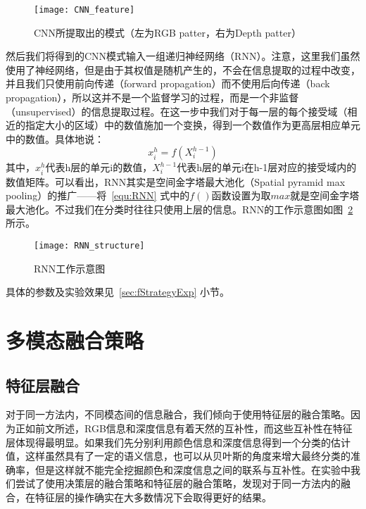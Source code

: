 \begin{figure}[H] %
  \centering
  \texttt{[image: CNN\_feature]}
  \caption{CNN所提取出的模式（左为RGB patter，右为Depth patter）}
  \label{fig:CNN_feature}
\end{figure}

然后我们将得到的CNN模式输入一组递归神经网络（RNN）。注意，这里我们虽然使用了神经网络，但是由于其权值是随机产生的，不会在信息提取的过程中改变，并且我们只使用前向传递（forward propagation）而不使用后向传递（back propagation），所以这并不是一个监督学习的过程，而是一个非监督（unsupervised）的信息提取过程。在这一步中我们对于每一层的每个接受域（相近的指定大小的区域）中的数值施加一个变换，得到一个数值作为更高层相应单元中的数值。具体地说：
\begin{equation}
\label{equ:RNN}
x_i^h = f(X_i^{h-1})
\end{equation}
其中，$x_i^h$代表h层的单元i的数值，$X_i^{h-1}$代表h层的单元i在h-1层对应的接受域内的数值矩阵。可以看出，RNN其实是空间金字塔最大池化（Spatial pyramid max pooling）的推广——将~\ref{equ:RNN} 式中的$f()$函数设置为取$max$就是空间金字塔最大池化。不过我们在分类时往往只使用上层的信息。RNN的工作示意图如图~\ref{fig:RNN_structure} 所示。


\begin{figure}[H] %
  \centering
  \texttt{[image: RNN\_structure]}
  \caption{RNN工作示意图}
  \label{fig:RNN_structure}
\end{figure}

具体的参数及实验效果见~\ref{sec:fStrategyExp} 小节。


\section{多模态融合策略}
\label{sec:fStrategy}

\subsection{特征层融合}
\label{subsec:fInMethod}

对于同一方法内，不同模态间的信息融合，我们倾向于使用特征层的融合策略。因为正如前文所述，RGB信息和深度信息有着天然的互补性，而这些互补性在特征层体现得最明显。如果我们先分别利用颜色信息和深度信息得到一个分类的估计值，这样虽然具有了一定的语义信息，也可以从贝叶斯的角度来增大最终分类的准确率，但是这样就不能完全挖掘颜色和深度信息之间的联系与互补性。在实验中我们尝试了使用决策层的融合策略和特征层的融合策略，发现对于同一方法内的融合，在特征层的操作确实在大多数情况下会取得更好的结果。

